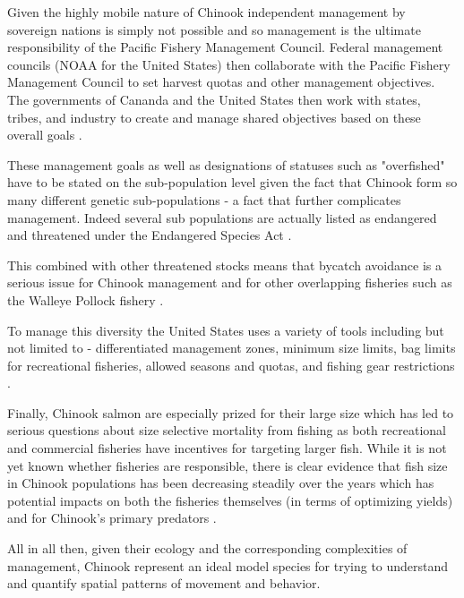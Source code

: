 \documentclass[11pt]{article}
\begin{document}
Given the highly mobile nature of Chinook independent management by sovereign nations is simply not possible and so management is the ultimate responsibility of the Pacific Fishery Management Council. Federal management councils (NOAA for the United States) then collaborate with the Pacific Fishery Management Council to set harvest quotas and other management objectives. The governments of Cananda and the United States then work with states, tribes, and industry to create and manage shared objectives based on these overall goals \cite{NOAA22}. 

These management goals as well as designations of statuses such as "overfished" have to be stated on the sub-population level given the fact that Chinook form so many different genetic sub-populations \cite{salmonplan} - a fact that further complicates management. Indeed several sub populations are actually listed as endangered and threatened under the Endangered Species Act \cite{NOAA24}.

This combined with other threatened stocks \cite{NOAA24} means that bycatch avoidance is a serious issue for Chinook management and for other overlapping fisheries such as the Walleye Pollock fishery \cite{ianelli2015}. 

To manage this diversity the United States uses a variety of tools including but not limited to - differentiated management zones, minimum size limits, bag limits for recreational fisheries, allowed seasons and quotas, and fishing gear restrictions \cite{salmonplan}. \newline

Finally, Chinook salmon are especially prized for their large size which has led to serious questions about size selective mortality from fishing as both recreational and commercial fisheries have incentives for targeting larger fish. While it is not yet known whether fisheries are responsible, there is clear evidence that fish size in Chinook populations has been decreasing steadily over the years which has potential impacts on both the fisheries themselves (in terms of optimizing yields) and for Chinook's primary predators \cite{kendall2011}\cite{oceanchinook}. \newline


All in all then, given their ecology and the corresponding complexities of management, Chinook represent an ideal model species for trying to understand and quantify spatial patterns of movement and behavior. 
\end{document}
